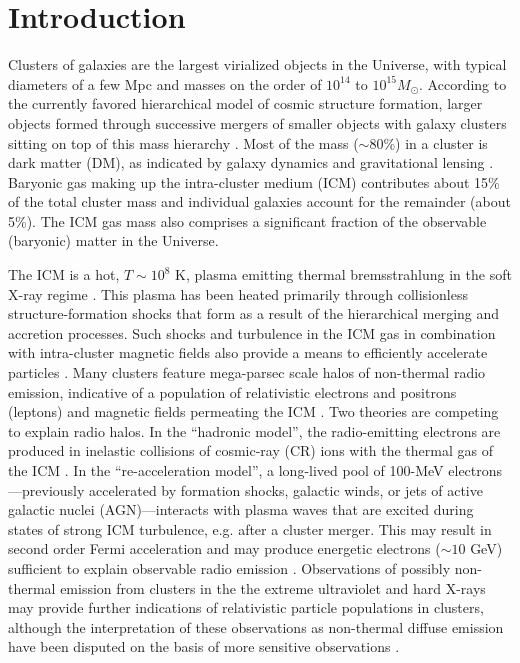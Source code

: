 \documentclass[12pt,manuscript]{aastex}
\begin{document}
%
%

\section{Introduction}
Clusters of galaxies are the largest virialized objects in the Universe, with typical diameters of a
few Mpc and masses on the order of $10^{14}$ to $10^{15} M_{\odot}$. According to the currently
favored hierarchical model of cosmic structure formation, larger objects formed through successive
mergers of smaller objects with galaxy clusters sitting on top of this mass hierarchy
\citep[see][for a review]{article:Voit:2005}. Most of the mass ($\sim$80\%) in a cluster is dark
matter (DM), as indicated by galaxy dynamics and gravitational lensing
\citep{article:DiaferioSchindlerDolag:2008}. Baryonic gas making up the intra-cluster medium (ICM)
contributes about 15\% of the total cluster mass and individual galaxies account for the remainder
(about 5\%). The ICM gas mass also comprises a significant fraction of the observable (baryonic)
matter in the Universe.

The ICM is a hot, $T\sim 10^{8}$ K, plasma emitting thermal bremsstrahlung in the soft X-ray regime
\citep[see, e.g.,][]{article:Petrosian:2001}. This plasma has been heated primarily through
collisionless structure-formation shocks that form as a result of the hierarchical merging and
accretion processes. Such shocks and turbulence in the ICM gas in combination with intra-cluster
magnetic fields also provide a means to efficiently accelerate particles \citep[see,
e.g.,][]{article:ColafrancescoBlasi:1998, article:Ryu_etal:2003}. Many clusters feature mega-parsec
scale halos of non-thermal radio emission, indicative of a population of relativistic electrons and
positrons (leptons) and magnetic fields permeating the ICM \citep{article:Cassano_etal:2010}. Two
theories are competing to explain radio halos. In the ``hadronic model'', the radio-emitting
electrons are produced in inelastic collisions of cosmic-ray (CR) ions with the thermal gas of the
ICM \citep{article:Dennison:1980, article:EnsslinPfrommerMiniatiSubramanian:2011}. In the
``re-acceleration model'', a long-lived pool of 100-MeV electrons---previously accelerated by
formation shocks, galactic winds, or jets of active galactic nuclei (AGN)---interacts with plasma
waves that are excited during states of strong ICM turbulence, e.g. after a cluster merger. This may
result in second order Fermi acceleration and may produce energetic electrons ($\sim 10$ GeV)
sufficient to explain observable radio emission \citep{article:SchlickeiserSieversThiemann:1987,
  article:BrunettiLazarian:2010}. Observations of possibly non-thermal emission from clusters
in the the extreme ultraviolet \citep[EUV; ][]{article:SarazinLieu:1998} and hard X-rays
\citep{article:RephaeliGruber:2002, article:Fusco-Femiano_etal:2004, article:Eckert_etal:2007} may
provide further indications of relativistic particle populations in clusters, although the
interpretation of these observations as non-thermal diffuse emission have been disputed on the basis
of more sensitive observations \citep[see, e.g.,][]{article:Ajello_etal:2009,
  article:Ajello_etal:2010, article:Wik_etal:2009}.
\end{document}
